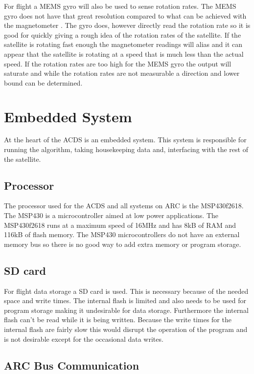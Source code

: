 For flight a \ac{MEMS} gyro will also be used to sense rotation rates. The \ac{MEMS} gyro does not have that great resolution compared to what can be achieved with the magnetometer . The gyro does, however directly read the rotation rate so it is good for quickly giving a rough idea of the rotation rates of the satellite. If the satellite is rotating fast enough the magnetometer readings will alias and it can appear that the satellite is rotating at a speed that is much less than the actual speed. If the rotation rates are too high for the \ac{MEMS} gyro the output will saturate and while the rotation rates are not measurable a direction and lower bound can be determined.


\section{Embedded System}

At the heart of the \ac{ACDS} is an embedded system. This system is responsible for running the algorithm, taking housekeeping data and, interfacing with the rest of the satellite.

\subsection{Processor}

The processor used for the \ac{ACDS} and all systems on \ac{ARC} is the MSP430f2618. The MSP430 is a microcontroller aimed at low power applications. The MSP430f2618 runs at a maximum speed of 16MHz and has 8kB of RAM and 116kB of flash memory. The MSP430 microcontrollers do not have an external memory bus so there is no good way to add extra memory or program storage. 

\subsection{SD card}

For flight data storage a SD card is used. This is necessary because of the needed space and write times. The internal flash is limited and also needs to be used for program storage making it undesirable for data storage. Furthermore the internal flash can't be read while it is being written. Because the write times for the internal flash are fairly slow this would disrupt the operation of the program and is not desirable except for the occasional data writes.

\subsection{\acs{ARC} Bus Communication}

